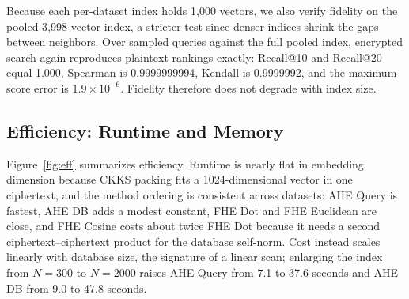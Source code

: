 \documentclass[sigconf,nonacm]{acmart}
\begin{document}
\begin{table}[t]
\centering\setlength{\tabcolsep}{4pt}
\caption{Encrypted additive search reproduces plaintext rankings exactly. The Blocked Inner Product matches the flat inner product to within $4.4\times10^{-16}$ on every dataset.}
\label{tab:fidelity}
\end{table}

Because each per-dataset index holds 1{,}000 vectors, we also verify fidelity on the pooled 3{,}998-vector index, a stricter test since denser indices shrink the gaps between neighbors. Over sampled queries against the full pooled index, encrypted search again reproduces plaintext rankings exactly: Recall@10 and Recall@20 equal 1.000, Spearman is 0.9999999994, Kendall is 0.9999992, and the maximum score error is $1.9\times10^{-6}$. Fidelity therefore does not degrade with index size.

\subsection{Efficiency: Runtime and Memory}
\label{sec:runtime}
Figure~\ref{fig:eff} summarizes efficiency. Runtime is nearly flat in embedding dimension because CKKS packing fits a 1024-dimensional vector in one ciphertext, and the method ordering is consistent across datasets: AHE Query is fastest, AHE DB adds a modest constant, FHE Dot and FHE Euclidean are close, and FHE Cosine costs about twice FHE Dot because it needs a second ciphertext--ciphertext product for the database self-norm. Cost instead scales linearly with database size, the signature of a linear scan; enlarging the index from $N{=}300$ to $N{=}2000$ raises AHE Query from 7.1 to 37.6 seconds and AHE DB from 9.0 to 47.8 seconds.
\end{document}
